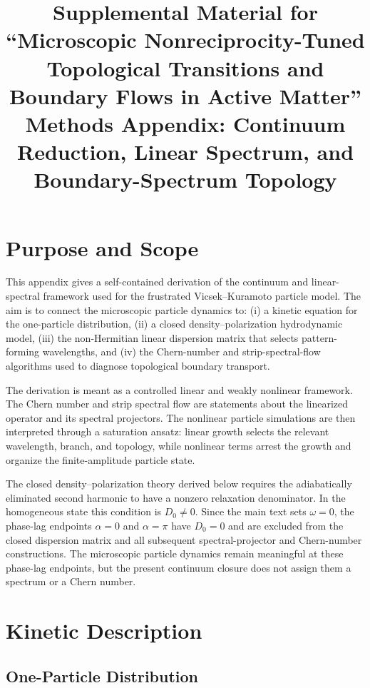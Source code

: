 \documentclass[11pt]{article}
\title{Supplemental Material for ``Microscopic Nonreciprocity-Tuned Topological Transitions and Boundary Flows in Active Matter''\\[0.4em]
\large Methods Appendix: Continuum Reduction, Linear Spectrum, and Boundary-Spectrum Topology}
\author{}
\date{}
\numberwithin{equation}{section}
\begin{document}
\maketitle

\section{Purpose and Scope}

This appendix gives a self-contained derivation of the continuum and
linear-spectral framework used for the frustrated Vicsek--Kuramoto
particle model. The aim is to connect the microscopic particle dynamics
to: (i) a kinetic equation for the one-particle distribution, (ii) a
closed density--polarization hydrodynamic model, (iii) the non-Hermitian
linear dispersion matrix that selects pattern-forming wavelengths, and
(iv) the Chern-number and strip-spectral-flow algorithms used to diagnose
topological boundary transport.

The derivation is meant as a controlled linear and weakly nonlinear
framework. The Chern number and strip spectral flow are statements about
the linearized operator and its spectral projectors. The nonlinear
particle simulations are then interpreted through a saturation ansatz:
linear growth selects the relevant wavelength, branch, and topology, while
nonlinear terms arrest the growth and organize the finite-amplitude
particle state.

The closed density--polarization theory derived below requires the
adiabatically eliminated second harmonic to have a nonzero relaxation
denominator. In the homogeneous state this condition is $D_0\ne0$. Since
the main text sets $\omega=0$, the phase-lag endpoints $\alpha=0$ and $\alpha=\pi$
have $D_0=0$ and are excluded from the closed dispersion matrix and all
subsequent spectral-projector and Chern-number constructions. The
microscopic particle dynamics remain meaningful at these phase-lag endpoints, but
the present continuum closure does not assign them a spectrum or a Chern
number.

\section{Kinetic Description}

\subsection{One-Particle Distribution}
\end{document}
